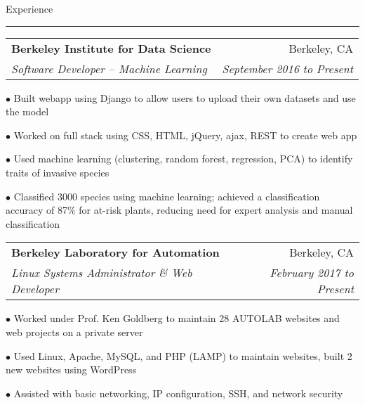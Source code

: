 \documentclass[11pt,letterpaper]{article}
\makeatletter
\newcommand{\bulletpoint}{\rule{0cm}{2pt}$\bullet$  }
\newenvironment{topic}[1]
    {
    \tabto{225pt}
    \large #1
    \vspace*{0.03in}
    \hrule 
    \vspace*{0.05in}
    }
    {
    }
\newenvironment{event}
    {
    \begin{tabular*}{\textwidth}{l@{\extracolsep{\fill}}r}
    }
    {
    \end{tabular*}
    }
\newenvironment{detail}
    {
    \normalsize
    }
    {
    \vspace*{0.02in}
    }
\makeatother
\begin{document}
    \begin{topic}{Experience}
        \begin{event}
            \textbf{Berkeley Institute for Data Science} & Berkeley, CA \\
            \emph{Software Developer -- Machine Learning} & \emph{September 2016 to Present} \\
        \end{event}
            \begin{detail}
                \bulletpoint Built webapp using Django to allow users to upload their own datasets and use the model \\
                \bulletpoint Worked on full stack using CSS, HTML, jQuery, ajax, REST to create web app \\
                \bulletpoint Used machine learning (clustering, random forest, regression, PCA) to identify traits of invasive species\\
                \bulletpoint Classified 3000 species using machine learning; achieved a classification accuracy of 87\% for at-risk plants, reducing need for expert analysis and manual classification \\
            \end{detail}
        \vspace*{-0.1in}

        \begin{event}
            \textbf{Berkeley Laboratory for Automation} & Berkeley, CA \\
            \emph{Linux Systems Administrator \& Web Developer} & \emph{February 2017 to Present}
        \end{event}
            \begin{detail}
                \bulletpoint Worked under Prof. Ken Goldberg to maintain 28 AUTOLAB websites and web projects on a private server \\
                \bulletpoint Used Linux, Apache, MySQL, and PHP (LAMP) to maintain websites, built 2 new websites using WordPress  \\
                \bulletpoint Assisted with basic networking, IP configuration, SSH, and network security
            \end{detail}
        \vspace*{0.1in}
        
    \end{topic} \vspace*{-0.1in}
\end{document}
